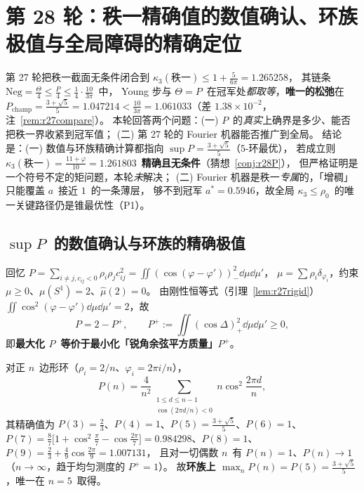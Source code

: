 \section{第 28 轮：秩一精确值的数值确认、环族极值与全局障碍的精确定位}\label{sec:r28}

第 27 轮把秩一截面无条件闭合到 $\kappa_3(\text{秩一})\le1+\frac5{6\pi}=1.265258$，
其链条 $\mathrm{Neg}=\frac\Theta4\le\frac P4\le\frac14\cdot\frac{10}{3\pi}$~中，
Young 步与 $\Theta=P$~在冠军处\emph{都取等}，\textbf{唯一的松弛}在
$P_{\text{champ}}=\frac{3+\sqrt5}5=1.047214<\frac{10}{3\pi}=1.061033$（差 $1.38\times10^{-2}$，注~\ref{rem:r27compare}）。
本轮回答两个问题：(一) $P$~的\emph{真实}上确界是多少、能否把秩一界收紧到冠军值；
(二) 第 27 轮的 Fourier 机器能否推广到全局。
结论是：(一) 数值与环族精确计算都指向 $\sup P=\frac{3+\sqrt5}5$（$5$-环最优），
若成立则 $\kappa_3(\text{秩一})=\frac{11+\varphi}{10}=1.261803$~\textbf{精确且无条件}（猜想~\ref{conj:r28P}），
但严格证明是一个符号不定的矩问题，本轮\emph{未}解决；
(二) Fourier 机器是秩一\emph{专属}的，「增稠」只能覆盖 $a$~接近 $1$~的一条薄层，
够不到冠军 $a^*=0.5946$，故全局 $\kappa_3\le\rho_0$~的唯一关键路径仍是锥最优性（P1）。

\subsection{$\sup P$~的数值确认与环族的精确极值}\label{sec:r28:supP}

回忆 $P=\sum_{i\ne j,c_{ij}<0}\rho_i\rho_jc_{ij}^2=\iint(\cos(\varphi-\varphi'))_-^2\dd\mu\dd\mu'$，
$\mu=\sum\rho_i\delta_{\varphi_i}$，约束 $\mu\ge0$、$\mu(S^1)=2$、$\widehat\mu(2)=0$。
由刚性恒等式（引理~\ref{lem:r27rigid}）$\iint\cos^2(\varphi-\varphi')\dd\mu\dd\mu'=2$，故
\begin{equation}\label{eq:r28Pplus}
P=2-P^+,\qquad P^+:=\iint(\cos\Delta)_+^2\dd\mu\dd\mu'\ge0,
\end{equation}
即\textbf{最大化 $P$~等价于最小化「锐角余弦平方质量」$P^+$}。

\begin{proposition}[环族的精确极值，已证]\label{prop:r28ring}
对正 $n$~边形环（$\rho_i=2/n$、$\varphi_i=2\pi i/n$），
\[
P(n)=\frac4{n^2}\!\!\sum_{\substack{1\le d\le n-1\\ \cos(2\pi d/n)<0}}\!\!n\cos^2\frac{2\pi d}n,
\]
其精确值为 $P(3)=\frac23$、$P(4)=1$、$P(5)=\frac{3+\sqrt5}5$、$P(6)=1$、
$P(7)=\frac87\bigl[1+\cos^2\frac\pi7-\cos\frac{2\pi}7\bigr]=0.984298$、$P(8)=1$、$P(9)=\frac23+\frac49\cos\frac{2\pi}9=1.007131$，
且对一切偶数 $n$~有 $P(n)=1$、$P(n)\to1$（$n\to\infty$，趋于均匀测度的 $P^+=1$）。
故\textbf{环族上 $\max_nP(n)=P(5)=\frac{3+\sqrt5}5$}，唯一在 $n=5$~取得。
\end{proposition}

